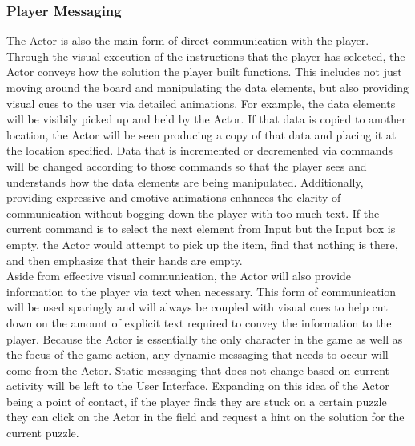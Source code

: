\subsubsection{Player Messaging}
The Actor is also the main form of direct communication with the player. Through the visual execution of the instructions that the player has selected, the Actor conveys how the solution the player built functions. This includes not just moving around the board and manipulating the data elements, but also providing visual cues to the user via detailed animations. For example, the data elements will be visibily picked up and held by the Actor. If that data is copied to another location, the Actor will be seen producing a copy of that data and placing it at the location specified. Data that is incremented or decremented via commands will be changed according to those commands so that the player sees and understands how the data elements are being manipulated. Additionally, providing expressive and emotive animations enhances the clarity of communication without bogging down the player with too much text. If the current command is to select the next element from Input but the Input box is empty, the Actor would attempt to pick up the item, find that nothing is there, and then emphasize that their hands are empty.\\

Aside from effective visual communication, the Actor will also provide information to the player via text when necessary. This form of communication will be used sparingly and will always be coupled with visual cues to help cut down on the amount of explicit text required to convey the information to the player. Because the Actor is essentially the only character in the game as well as the focus of the game action, any dynamic messaging that needs to occur will come from the Actor. Static messaging that does not change based on current activity will be left to the User Interface. Expanding on this idea of the Actor being a point of contact, if the player finds they are stuck on a certain puzzle they can click on the Actor in the field and request a hint on the solution for the current puzzle. \\